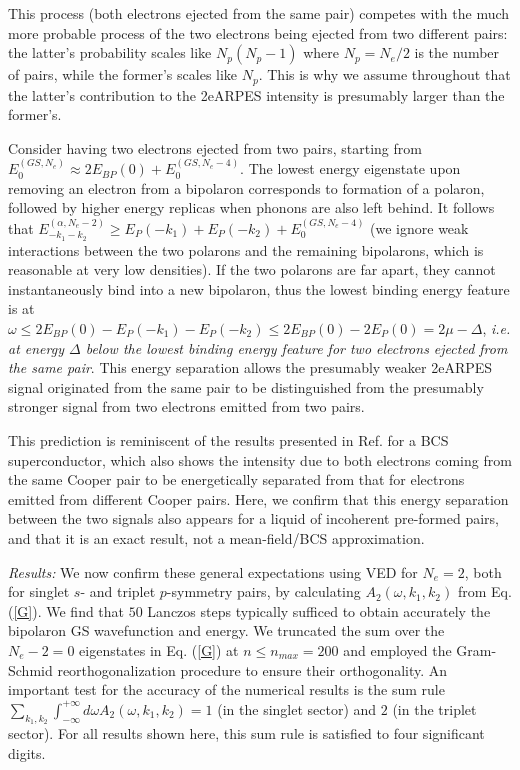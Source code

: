 \documentclass[prl,twocolumn,showpacs,amsmath,amssymb,superscriptaddress,floatfix]{revtex4}
\begin{document}
This process (both electrons ejected from the same pair) competes with the much more probable process of the two electrons being ejected from two different pairs: the latter's probability scales like $N_p(N_p-1)$ where $N_p=N_e/2$ is the number of pairs, while the former's scales like $N_p$. This is why we assume throughout  that the latter's contribution to the 2eARPES intensity  is  presumably larger than the former's.

Consider  having  two electrons ejected from two pairs, starting from $E_0^{(GS,N_e)}\approx 2 E_{BP}(0) + E_0^{(GS,N_e-4)}$. The lowest energy eigenstate upon removing an electron from a bipolaron corresponds to formation of a polaron, followed by higher energy replicas when phonons are also left behind. It follows that  $E_{-k_1-k_2}^{(\alpha,N_e-2)} \ge E_P(-k_1)+ E_P(-k_2) +E_0^{(GS,N_e-4)} $ (we ignore weak interactions between the two polarons and the remaining bipolarons, which is reasonable at very low densities). If the two  polarons are far apart, they cannot instantaneously bind into a new bipolaron, thus the  lowest binding energy feature  is at $\omega \le 2 E_{BP}(0) - E_P(-k_1)- E_P(-k_2) \le 2E_{BP}(0) - 2E_P(0)= 2\mu  - \Delta $, {\em i.e.} {\it at  energy $\Delta$ below the lowest binding energy feature for two electrons ejected from the same pair}.  This energy separation allows the presumably weaker 2eARPES signal originated from  the same pair to be distinguished from the presumably stronger  signal from two electrons emitted from two pairs.

This prediction is reminiscent of the results presented in Ref.  for a BCS superconductor, which also shows the intensity due to both electrons coming from the same Cooper pair to be energetically separated from that for electrons emitted from different Cooper pairs. Here,  we confirm that this energy separation between the two signals also appears for a liquid of incoherent pre-formed pairs, and that it is an exact result, not a mean-field/BCS approximation.

{\em Results:} We now confirm these general expectations using VED for $N_e=2$, both for singlet $s$- and triplet $p$-symmetry pairs, by calculating  $A_2(\omega,k_1,k_2)$ from Eq. (\ref{G}). We find that  $50$ Lanczos steps typically sufficed to obtain  accurately the bipolaron GS wavefunction and energy.   We truncated the sum over the $N_e-2=0$ eigenstates  in Eq. (\ref{G}) at $n \le n_{max}=200$ and employed the Gram-Schmid reorthogonalization procedure to ensure their orthogonality. An important test  for the accuracy of the numerical results is the sum rule $\sum_{k_1,k_2}\int_{-\infty}^{+\infty}d\omega A_2(\omega,k_1,k_2)=1$ (in the singlet sector) and $2$ (in the triplet sector). For all results shown here, this sum rule is satisfied to  four significant digits.
\end{document}
